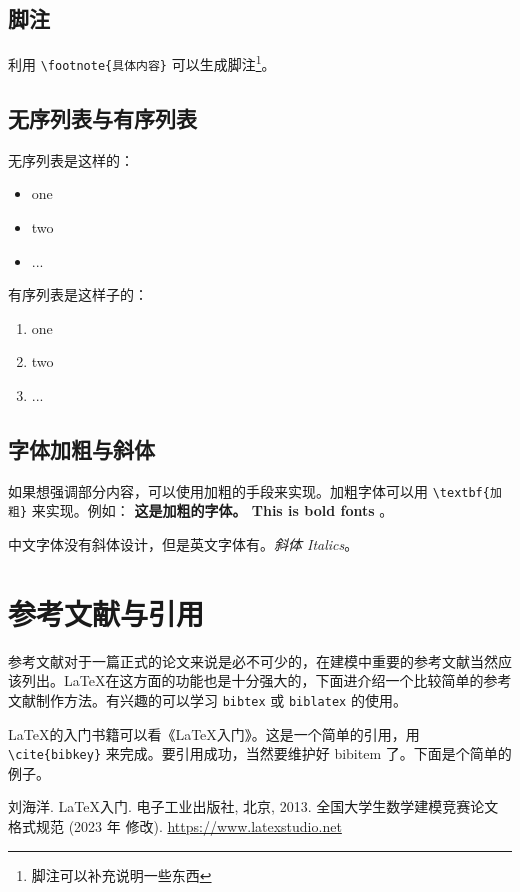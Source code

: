 \documentclass[withoutpreface,bwprint]{cumcmthesis}
\begin{document}
\subsection{脚注}

利用 \verb|\footnote{具体内容}| 可以生成脚注\footnote{脚注可以补充说明一些东西}。

\subsection{无序列表与有序列表}

无序列表是这样的：
\begin{itemize}
    \item one
    \item two
    \item ...
\end{itemize}

有序列表是这样子的：
\begin{enumerate}
    \item one
    \item two
    \item ...
\end{enumerate}

\subsection{字体加粗与斜体}

如果想强调部分内容，可以使用加粗的手段来实现。加粗字体可以用 \verb|\textbf{加粗}| 来实现。例如： \textbf{这是加粗的字体。 This is bold fonts} 。

中文字体没有斜体设计，但是英文字体有。\textit{斜体 Italics}。

\section{参考文献与引用}

参考文献对于一篇正式的论文来说是必不可少的，在建模中重要的参考文献当然应该列出。\LaTeX{}在这方面的功能也是十分强大的，下面进介绍一个比较简单的参考文献制作方法。有兴趣的可以学习 \verb|bibtex| 或 \verb|biblatex| 的使用。

\LaTeX{}的入门书籍可以看《\LaTeX{}入门》\cite{liuhaiyang2013latex}。这是一个简单的引用，用 \verb|\cite{bibkey}| 来完成。要引用成功，当然要维护好 bibitem 了。下面是个简单的例子。



\begin{thebibliography}{9}%
    刘海洋.
    \newblock \LaTeX {}入门\allowbreak[J].
    \newblock 电子工业出版社, 北京, 2013.
    全国大学生数学建模竞赛论文格式规范 (2023 年 修改).
     \url{https://www.latexstudio.net}
\end{thebibliography}
\end{document}
